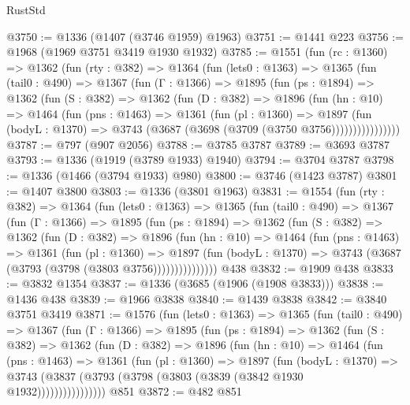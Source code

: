\begin{lexlean}{RustStd}
\begin{coremodule}
{\begin{coremodule}
{{{{{{{{{{{{{{@3750 := @1336 (@1407 (@3746 @1959) @1963)
@3751 := @1441 @223
@3756 := @1968 (@1969 @3751 @3419 @1930 @1932)
@3785 := @1551
    (fun (rc : @1360) =>
    @1362
      (fun (rty : @382) =>
      @1364
        (fun (lets0 : @1363) =>
        @1365
          (fun (tail0 : @490) =>
          @1367
            (fun (Γ : @1366) =>
            @1895
              (fun (ps : @1894) =>
              @1362
                (fun (S : @382) =>
                @1362
                  (fun (D : @382) =>
                  @1896
                    (fun (hn : @10) =>
                    @1464
                      (fun (pns : @1463) =>
                      @1361
                        (fun (pl : @1360) =>
                        @1897
                          (fun (bodyL : @1370) =>
                          @3743 (@3687 (@3698 (@3709 (@3750 @3756))))))))))))))))
@3787 := @797 (@907 @2056)
@3788 := @3785 @3787
@3789 := @3693 @3787
@3793 := @1336 (@1919 (@3789 @1933) @1940)
@3794 := @3704 @3787
@3798 := @1336 (@1466 (@3794 @1933) @980)
@3800 := @3746 (@1423 @3787)
@3801 := @1407 @3800
@3803 := @1336 (@3801 @1963)
@3831 := @1554
    (fun (rty : @382) =>
    @1364
      (fun (lets0 : @1363) =>
      @1365
        (fun (tail0 : @490) =>
        @1367
          (fun (Γ : @1366) =>
          @1895
            (fun (ps : @1894) =>
            @1362
              (fun (S : @382) =>
              @1362
                (fun (D : @382) =>
                @1896
                  (fun (hn : @10) =>
                  @1464
                    (fun (pns : @1463) =>
                    @1361
                      (fun (pl : @1360) =>
                      @1897
                        (fun (bodyL : @1370) =>
                        @3743 (@3687 (@3793 (@3798 (@3803 @3756)))))))))))))))
    @438
@3832 := @1909 @438
@3833 := @3832 @1354
@3837 := @1336 (@3685 (@1906 (@1908 @3833)))
@3838 := @1436 @438
@3839 := @1966 @3838
@3840 := @1439 @3838
@3842 := @3840 @3751 @3419
@3871 := @1576
    (fun (lets0 : @1363) =>
    @1365
      (fun (tail0 : @490) =>
      @1367
        (fun (Γ : @1366) =>
        @1895
          (fun (ps : @1894) =>
          @1362
            (fun (S : @382) =>
            @1362
              (fun (D : @382) =>
              @1896
                (fun (hn : @10) =>
                @1464
                  (fun (pns : @1463) =>
                  @1361
                    (fun (pl : @1360) =>
                    @1897
                      (fun (bodyL : @1370) =>
                      @3743 (@3837 (@3793 (@3798 (@3803 (@3839 (@3842 @1930 @1932))))))))))))))))
    @851
@3872 := @482 @851
}}}}}}}}}}}}}}
\end{coremodule}}
\end{coremodule}
\end{lexlean}
